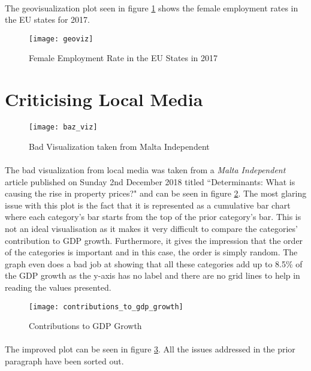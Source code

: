\paragraph{ }The geovisualization plot seen in figure \ref{fig::geoviz} shows the female employment rates in the EU states for 2017.
\begin{figure}[!t]
	\centering
	\texttt{[image: geoviz]}
	\caption[Female Employment Rate in the EU]{Female Employment Rate in the EU States in 2017}
	\label{fig::geoviz}
\end{figure}

\section{Criticising Local Media}
\begin{figure}[!b]
	\centering
	\texttt{[image: baz\_viz]}
	\caption[Bad Visualization]{Bad Visualization taken from Malta Independent}
	\label{fig::badviz}
\end{figure}
\paragraph{ }The bad visualization from local media was taken from a \textit{Malta Independent} article published on Sunday 2nd December 2018 titled ``Determinants: What is causing the rise in property prices?" and can be seen in figure \ref{fig::badviz}. The most glaring issue with this plot is the fact that it is represented as a cumulative bar chart where each category's bar starts from the top of the prior category's bar. This is not an ideal visualisation as it makes it very difficult to compare the categories' contribution to GDP growth. Furthermore, it gives the impression that the order of the categories is important and in this case, the order is simply random. The graph even does a bad job at showing that all these categories add up to 8.5\% of the GDP growth as the y-axis has no label and there are no grid lines to help in reading the values presented.

\begin{figure}[!b]
	\centering
	\texttt{[image: contributions\_to\_gdp\_growth]}
	\caption[Improved Plot]{Contributions to GDP Growth}
	\label{fig::fixed}
\end{figure}

\paragraph{ }The improved plot can be seen in figure \ref{fig::fixed}. All the issues addressed in the prior paragraph have been sorted out.  
